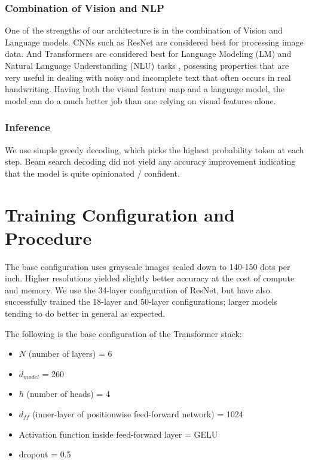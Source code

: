 \documentclass[runningheads]{llncs}
\begin{document}
\subsubsection{Combination of Vision and NLP}
One of the strengths of our architecture is in the combination of Vision and Language models.
{\small CNN}s such as ResNet are considered best for processing image data.
And Transformers are considered best for Language Modeling ({\small LM}) and Natural Language Understanding ({\small NLU}) tasks \citep{raffel2020exploring,Radford2018ImprovingLU,devlin2019bert}, posessing properties that are very useful in dealing with noisy and incomplete text that often occurs in real handwriting.
Having both the visual feature map and a language model, the model can do a much better job than one relying on visual features alone.

\subsubsection{Inference}
We use simple greedy decoding, which picks the highest probability token at each step.
Beam search decoding \citep{Graves2008SupervisedSL} did not yield any accuracy improvement indicating that the model is quite opinionated / confident.

\section{Training Configuration and Procedure}
The base configuration uses grayscale images scaled down to 140-150 dots per inch.
Higher resolutions yielded slightly better accuracy at the cost of compute and memory.
We use the 34-layer configuration of ResNet, but have also successfully trained the 18-layer and 50-layer configurations; larger models tending to do better in general as expected.

The following is the base configuration of the Transformer stack:
\begin{itemize}
    \item $N$ (number of layers) = 6
    \item $d_{model}$ = 260
    \item $h$ (number of heads) = 4
    \item $d_{ff}$ (inner-layer of positionwise feed-forward network) = 1024
    \item Activation function inside feed-forward layer = {\small GELU} \citep{DBLP:journals/corr/HendrycksG16}
    \item dropout = 0.5
\end{itemize}
\end{document}
